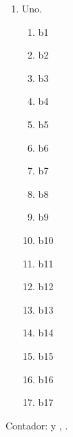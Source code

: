 \documentclass{article}
\newcounter{c}
\begin{document}
\begin{enumerate}
\item Uno.
\begin{enumerate}
\item b1
\item b2
\item b3
\item b4
\item b5
\item b6
\item b7
\item b8
\item b9
\item b10
\item b11
\item b12
\item b13
\item b14
\item b15\label{n}
\item b16
\item b17
\end{enumerate}
\end{enumerate}
\setcounter{c}{15}Contador:  y , .
\end{document}
